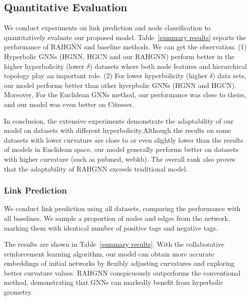 \subsection{Quantitative Evaluation}
We conduct experiments on link prediction and node classification to quantitatively evaluate our proposed model. 
Table~\ref{summary results} reports the performance of RAHGNN and baseline methods. 
We can get the observation: 
(1) Hyperbolic GNNs (HGNN, HGCN and our RAHGNN) perform better in the higher hyperbolicity (lower $\delta$) datasets where both node features and hierarchical topology play an important role. 
(2) For lower hyperbolicity (higher $\delta$) data sets, our model performs better than other hyerpbolic GNNs (HGNN and HGCN). 
Moreover, For the Euclidean GNNs method, our performance was close to theirs, and our model was even better on Citeseer.

In conclusion, the extensive experiments demonstrate the adaptability of our model on datasets with different hyperbolicity.Although the results on some datasets with lower curvature are close to or even slightly lower than the results of models in Euclidean space, our model generally performs better on datasets with higher curvature (such as pubmed, webkb). The overall rank also proves that the adaptability of RAHGNN exceeds traditional model.

\subsubsection{Link Prediction}
We conduct link prediction using all datasets, comparing the performance with all baselines.
We sample a proportion of nodes and edges from the network, marking them with identical number of positive tags and negative tags.

The results are shown in Table~\ref{summary results}. 
With the collaborative reinforcement learning algorithm, our model can obtain more accurate embeddings of initial networks by flexibly adjusting curvatures and exploring better curvature values.
RAHGNN conspicuously outperforms the conventional method, demonstrating that GNNs can markedly benefit from hyperbolic geometry.
